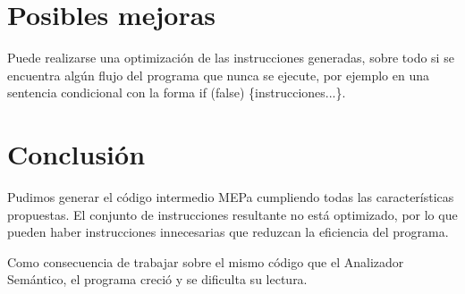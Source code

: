 \section{Posibles mejoras}
Puede realizarse una optimización de las instrucciones generadas, sobre todo si se encuentra algún flujo del programa que nunca se ejecute, por ejemplo en una sentencia condicional con la forma if (false) \{instrucciones...\}.

\section{Conclusión}
Pudimos generar el código intermedio MEPa cumpliendo todas las características propuestas. El conjunto de instrucciones resultante no está optimizado, por lo que pueden haber instrucciones innecesarias que reduzcan la eficiencia del programa.

Como consecuencia de trabajar sobre el mismo código que el Analizador Semántico, el programa creció y se dificulta su lectura.
